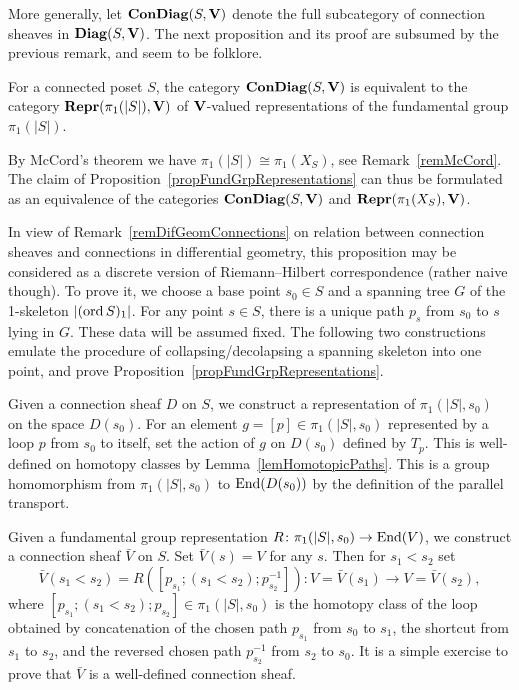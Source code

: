 More generally, let $\mathbf{ConDiag}(S,\mathbf{V})$ denote the full subcategory of connection sheaves in $\mathbf{Diag}(S,\mathbf{V})$. The next proposition and its proof are subsumed by the previous remark, and seem to be folklore. 

\begin{prop}\label{propFundGrpRepresentations}
For a connected poset $S$, the category $\mathbf{ConDiag}(S,\mathbf{V})$ is equivalent to the category $\mathbf{Repr}(\pi_1(|S|),\mathbf{V})$ of $\mathbf{V}$-valued representations of the fundamental group $\pi_1(|S|)$.
\end{prop}

\begin{rem}
By McCord's theorem we have $\pi_1(|S|)\cong \pi_1(X_S)$, see Remark~\ref{remMcCord}. The claim of Proposition~\ref{propFundGrpRepresentations} can thus be formulated as an equivalence of the categories $\mathbf{ConDiag}(S,\mathbf{V})$ and $\mathbf{Repr}(\pi_1(X_S),\mathbf{V})$.
\end{rem}

In view of Remark~\ref{remDifGeomConnections} on relation between connection sheaves and connections in differential geometry, this proposition may be considered as a discrete version of Riemann--Hilbert correspondence (rather naive though). To prove it, we choose a base point $s_0\in S$ and a spanning tree $G$ of the 1-skeleton $|(\operatorname{ord} S)_1|$. For any point $s\in S$, there is a unique path $p_s$ from $s_0$ to $s$ lying in $G$. These data will be assumed fixed. The following two constructions emulate the procedure of collapsing/decolapsing a spanning skeleton into one point, and prove Proposition~\ref{propFundGrpRepresentations}.

\begin{con}\label{conConSheafToRepr}
Given a connection sheaf $D$ on $S$, we construct a representation of $\pi_1(|S|,s_0)$ on the space $D(s_0)$. For an element $g=[p]\in\pi_1(|S|,s_0)$ represented by a loop $p$ from $s_0$ to itself, set the action of $g$ on $D(s_0)$ defined by $T_p$. This is well-defined on homotopy classes by Lemma~\ref{lemHomotopicPaths}. This is a group homomorphism from $\pi_1(|S|,s_0)$ to $\operatorname{End}(D(s_0))$ by the definition of the parallel transport.
\end{con}

\begin{con}\label{conReprToConSheaf}
Given a fundamental group representation $R\colon \pi_1(|S|,s_0)\to \operatorname{End}(V)$, we construct a connection sheaf $\bar{V}$ on $S$. Set $\bar{V}(s)=V$ for any $s$. Then for $s_1<s_2$ set
\[
\bar{V}(s_1<s_2)=R([p_{s_1};(s_1<s_2);p_{s_2}^{-1}])\colon V=\bar{V}(s_1)\to V=\bar{V}(s_2),
\]
where $[p_{s_1};(s_1<s_2);p_{s_2}]\in \pi_1(|S|,s_0)$ is the homotopy class of the loop obtained by concatenation of the chosen path $p_{s_1}$ from $s_0$ to $s_1$, the shortcut from $s_1$ to $s_2$, and the reversed chosen path $p_{s_2}^{-1}$ from $s_2$ to $s_0$. It is a simple exercise to prove that $\bar{V}$ is a well-defined connection sheaf.
\end{con}

